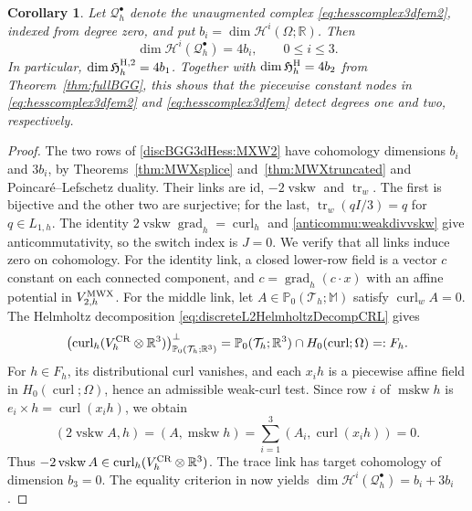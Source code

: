 \documentclass[10pt]{amsart}
\numberwithin{equation}{section}
\newtheorem{corollary}[theorem]{Corollary}
\newcommand{\curl}{\operatorname{curl}}
\newcommand{\grad}{\operatorname{grad}}
\newcommand{\tr}{\operatorname{tr}}
\newcommand{\mskw}{\operatorname{mskw}}
\newcommand{\vskw}{\operatorname{vskw}}
\begin{document}
\begin{corollary}\label{cor:weakHessianCohomology}
Let $\mathcal Q_h^\bullet$ denote the unaugmented complex
\eqref{eq:hesscomplex3dfem2}, indexed from degree zero, and put
$b_i=\dim \mathscr H^i(\Omega;\mathbb R)$. Then
\[
\dim \mathscr H^i(\mathcal Q_h^\bullet)=4b_i,\qquad 0\leq i\leq3.
\]
In particular, $\dim\mathfrak H_h^{\rm H,2}=4b_1$.
Together with $\dim\mathfrak H_h^{\rm H}=4b_2$ from
Theorem~\ref{thm:fullBGG}, this shows that the piecewise constant nodes
in \eqref{eq:hesscomplex3dfem2} and \eqref{eq:hesscomplex3dfem}
detect degrees one and two, respectively.
\end{corollary}
\begin{proof}
The two rows of \eqref{discBGG3dHess:MXW2} have cohomology dimensions
$b_i$ and $3b_i$, by Theorems~\ref{thm:MWXsplice}
and~\ref{thm:MWXtruncated} and Poincar\'e--Lefschetz duality.
Their links are $\mathrm{id}$, $-2\vskw$ and $\tr_w$.
The first is bijective and the other two are surjective;
for the last, $\tr_w(qI/3)=q$ for $q\in L_{1,h}$.
The identity $2\vskw\grad_h=\curl_h$ and
\eqref{anticommu:weakdivvskw} give anticommutativity, so the switch
index is $J=0$.
We verify that all links induce zero on cohomology.
For the identity link, a closed lower-row field is a vector $c$ constant
on each connected component, and $c=\grad_h(c\cdot x)$ with an affine
potential in $V_{2,h}^{\rm MWX}$.
For the middle link, let $A\in\mathbb P_0(\mathcal T_h;\mathbb M)$
satisfy $\curl_wA=0$. The Helmholtz decomposition
\eqref{eq:discreteL2HelmholtzDecompCRL} gives
\[
\bigl(\curl_h(V_h^{\rm CR}\otimes\mathbb R^3)\bigr)^\perp_
 {\mathbb P_0(\mathcal T_h;\mathbb R^3)}
=\mathbb P_0(\mathcal T_h;\mathbb R^3)\cap H_0(\curl;\Omega)=:F_h.
\]
For $h\in F_h$, its distributional curl vanishes, and each $x_i h$
is a piecewise affine field in $H_0(\curl;\Omega)$, hence an admissible
weak-curl test. Since row $i$ of $\mskw h$ is
$e_i\times h=\curl(x_i h)$, we obtain
\[
(2\vskw A,h)=(A,\mskw h)
=\sum_{i=1}^3(A_i,\curl(x_i h))=0.
\]
Thus $-2\vskw A\in\curl_h(V_h^{\rm CR}\otimes\mathbb R^3)$.
The trace link has target cohomology of dimension $b_3=0$.
The equality criterion in \cite[Theorem 6]{ArnoldHu2021} now yields
$\dim \mathscr H^i(\mathcal Q_h^\bullet)=b_i+3b_i$.
\end{proof}
\end{document}
